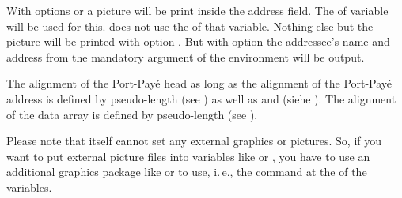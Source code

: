 With options
or  a picture will be print inside the address
field. The  of variable  will be used
for this. \KOMAScript{} does not use the  of that
variable. Nothing else but the picture will be printed with option
. But with option
 the addressee's name and address from
the mandatory argument of the  environment will be
output.

The alignment of the Port-Pay\'e head as long as the alignment of the
Port-Pay\'e address is defined by pseudo-length  (see
) as well as
 and  (siehe
). The alignment of
the data array is defined by pseudo-length 
(see ).

Please note that \KOMAScript{} itself cannot set any
external graphics or pictures. So, if you want to put external picture files
into variables like  or , you
have to use an additional graphics package like
 or
 to use, i.\,e., the command
 at the  of the variables.%
%
%
%
%
%
%
%


